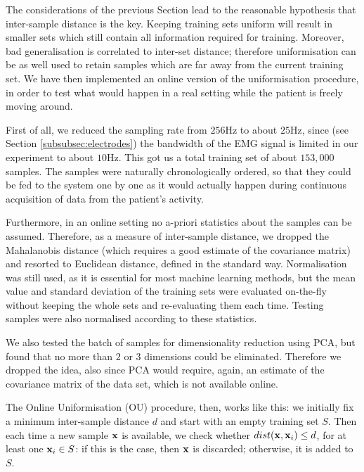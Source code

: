 The considerations of the previous Section lead to the reasonable
hypothesis that inter-sample distance is the key. Keeping training
sets uniform will result in smaller sets which still contain all
information required for training. Moreover, bad generalisation is
correlated to inter-set distance; therefore uniformisation can be as
well used to retain samples which are far away from the current
training set. We have then implemented an online version of the
uniformisation procedure, in order to test what would happen in a real
setting while the patient is freely moving around.

First of all, we reduced the sampling rate from $256$Hz to about
$25$Hz, since (see Section \ref{subsubsec:electrodes}) the bandwidth
of the EMG signal is limited in our experiment to about $10$Hz. This
got us a total training set of about $153,000$ samples. The samples
were naturally chronologically ordered, so that they could be fed to
the system one by one as it would actually happen during continuous
acquisition of data from the patient's activity.

Furthermore, in an online setting no a-priori statistics about the
samples can be assumed. Therefore, as a measure of inter-sample
distance, we dropped the Mahalanobis distance (which requires a good
estimate of the covariance matrix) and resorted to Euclidean distance,
defined in the standard way. Normalisation was still used, as it is
essential for most machine learning methods, but the mean value and
standard deviation of the training sets were evaluated on-the-fly
without keeping the whole sets and re-evaluating them each
time. Testing samples were also normalised according to these
statistics.

We also tested the batch of samples for dimensionality reduction using
PCA, but found that no more than $2$ or $3$ dimensions could be
eliminated. Therefore we dropped the idea, also since PCA would
require, again, an estimate of the covariance matrix of the data set,
which is not available online.

The Online Uniformisation (OU) procedure, then, works like this: we
initially fix a minimum inter-sample distance $d$ and start
with an empty training set $S$. Then each time a new sample $\mathbf{x}$ is
available, we check whether $dist(\mathbf{x},\mathbf{x}_i)\leq d$, for at
least one $\mathbf{x}_i \in S$: if this is the case, then $\mathbf{x}$ is discarded;
otherwise, it is added to $S$.

